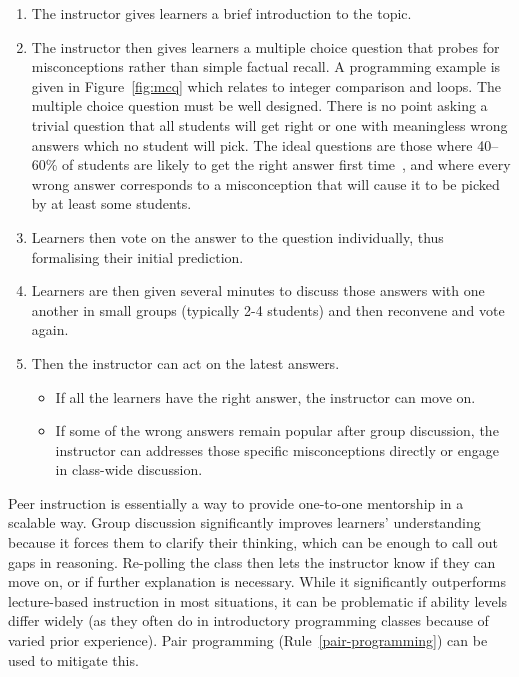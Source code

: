 \documentclass[10pt,letterpaper]{article}
\newcommand{\ruleref}[1]{Rule~\ref{#1}}
\begin{document}
\begin{enumerate}

\item The instructor gives learners a brief introduction to the topic.

\item The instructor then gives learners a multiple choice question
  that probes for misconceptions rather than simple factual recall.
  A programming example is given in Figure~\ref{fig:mcq}
  which relates to integer comparison and loops.  The multiple choice question must be well designed.
  There is no point asking a trivial question that all students will get right or one with meaningless wrong answers which no student will pick.
  The ideal questions are those where 40--60\% of students are likely to get the right answer first time~\cite[p23]{nrc-reaching}, and where every wrong answer corresponds to a misconception that will cause it to be picked by at least some students.

\item Learners then vote on the answer to the question individually, thus formalising their initial prediction.

\item Learners are then given several minutes to discuss those answers with one another
    in small groups (typically 2-4 students)
    and then reconvene and vote again.
\item Then the instructor can act on the latest answers.
  \begin{itemize}
  \item If all the learners have the right answer, the instructor can move on.
  \item If some of the wrong answers remain popular after group discussion,
    the instructor can addresses those specific misconceptions directly or engage in class-wide discussion.
  \end{itemize}

\end{enumerate}

Peer instruction is essentially
a way to provide one-to-one mentorship in a scalable way.
Group discussion significantly improves learners' understanding
because it forces them to clarify their thinking,
which can be enough to call out gaps in reasoning.
Re-polling the class then lets the instructor know if they can move on,
or if further explanation is necessary.
While it significantly outperforms lecture-based instruction in most situations,
it can be problematic if ability levels differ widely
(as they often do in introductory programming classes
because of varied prior experience).
Pair programming (\ruleref{pair-programming}) can be used to mitigate this.
\end{document}
